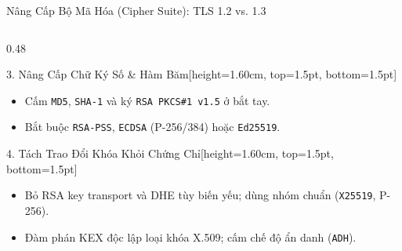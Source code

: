 \documentclass[aspectratio=169, 10pt]{beamer}
\begin{document}
\begin{frame}{Nâng Cấp Bộ Mã Hóa (Cipher Suite): TLS 1.2 vs. 1.3}
\begin{columns}[T]
		\begin{column}{0.48\textwidth}
			\begin{accentcard}[uetblue]{3. Nâng Cấp Chữ Ký Số \& Hàm Băm}[height=1.60cm, top=1.5pt, bottom=1.5pt]
				\begin{itemize}\setlength{\itemsep}{0.35pt}\setlength{\topsep}{0pt}\fontsize{6.2pt}{7.4pt}\selectfont
					\item Cấm \texttt{MD5}, \texttt{SHA-1} và ký \texttt{RSA PKCS\#1 v1.5} ở bắt tay.
					\item Bắt buộc \texttt{RSA-PSS}, \texttt{ECDSA} (P-256/384) hoặc \texttt{Ed25519}.
				\end{itemize}
			\end{accentcard}
			\vspace{0.05cm}
			\begin{accentcard}[uetblue]{4. Tách Trao Đổi Khóa Khỏi Chứng Chỉ}[height=1.60cm, top=1.5pt, bottom=1.5pt]
				\begin{itemize}\setlength{\itemsep}{0.35pt}\setlength{\topsep}{0pt}\fontsize{6.2pt}{7.4pt}\selectfont
					\item Bỏ RSA key transport và DHE tùy biến yếu; dùng nhóm chuẩn (\texttt{X25519}, P-256).
					\item Đàm phán KEX độc lập loại khóa X.509; cấm chế độ ẩn danh (\texttt{ADH}).
				\end{itemize}
			\end{accentcard}
		\end{column}
	\end{columns}
\end{frame}
\end{document}
